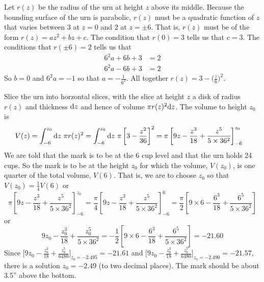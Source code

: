 \begin{solution}
 Let $r(z)$ be the radius of the urn at height $z$ above its middle.
Because the bounding surface of the urn is parabolic, $r(z)$ must be a
quadratic function of $z$ that varies between $3$ at $z=0$ and $2$ at $z=\pm
6$. That is, $r(z)$ must be of the form $r(z)=az^2+bz+c$.
The condition that $r(0)=3$ tells us that $c=3$. The conditions that 
$r(\pm 6)=2$ tells us that 
\begin{align*}
6^2a + 6b + 3 &=2 \\ 
6^2a - 6b + 3 &=2
\end{align*} 
So $b=0$ and $6^2a=-1$ so that $a=-\frac{1}{6^2}$.
All together $r(z)=3-\big(\frac{z}{6}\big)^2$. 

Slice
the urn into horzontal slices, with the slice at height $z$ a disk of radius 
$r(z)$ and thickness $\mathrm{d}z$ and hence of volume $\pi r(z)^2\mathrm{d}z$. The volume
to height $z_0$ is
\begin{align*}
V(z)
&=\int_{-6}^{z_0} \mathrm{d}z\ \pi r(z)^2
=\int_{-6}^{z_0} \mathrm{d}z\ \pi\left[3-\frac{z^2}{36}\right]^2
=\pi\left[9z-\frac{z^3}{18}+\frac{z^5}{5\times36^2}\right]_{-6}^{z_0}\cr
\end{align*}
We are told that the mark is to be at the 6 cup level and that the urn holds 24 cups. So the mark is to be at the height $z_0$ for which the volume, $V(z_0)$,
is one quarter of the total volume, $V(6)$.  
That is, we are to choose $z_0$ so that $V(z_0)=\frac{1}{4} V(6)$ or
\begin{equation*}
\pi\left[9z-\frac{z^3}{18}+\frac{z^5}{5\times36^2}\right]_{-6}^{z_0}
=\frac{\pi}{4}\left[9z-\frac{z^3}{18}+\frac{z^5}{5\times36^2}\right]_{-6}^{6}
=\frac{\pi}{2}\left[9\times 6-\frac{6^3}{18}+\frac{6^5}{5\times36^2}\right]
\end{equation*} 
or
\begin{equation*}
9z_0-\frac{z_0^3}{18}+\frac{z_0^5}{5\times36^2}
=-\frac{1}{2}\left[9\times 6-\frac{6^3}{18}+\frac{6^5}{5\times36^2}\right]
=-21.60
\end{equation*}
Since $\Big[9z_0-\frac{z_0^3}{18}+\frac{z_0^5}{6480}\Big]_{z_0=-2.495}=-21.61$
and $\Big[9z_0-\frac{z_0^3}{18}+\frac{z_0^5}{6480}\Big]_{z_0=-2.490}=-21.57$,
there is a solution $z_0=-2.49$ (to two decimal places). The mark should
be about 3.5'' above the bottom.
\end{solution}

